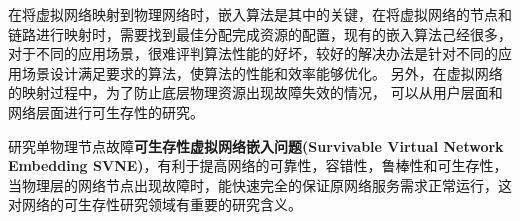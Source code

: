 在将虚拟网络映射到物理网络时，嵌入算法是其中的关键，在将虚拟网络的节点和链路进行映射时，需要找到最佳分配完成资源的配置，现有的嵌入算法己经很多，对于不同的应用场景，很难评判算法性能的好坏，较好的解决办法是针对不同的应用场景设计满足要求的算法，使算法的性能和效率能够优化。 另外，在虚拟网络的映射过程中，为了防止底层物理资源出现故障失效的情况， 可以从用户层面和网络层面进行可生存性的研究。

研究单物理节点故障\textbf{可生存性虚拟网络嵌入问题(Survivable Virtual Network Embedding SVNE)}，有利于提高网络的可靠性，容错性，鲁棒性和可生存性，当物理层的网络节点出现故障时，能快速完全的保证原网络服务需求正常运行，这对网络的可生存性研究领域有重要的研究含义。



